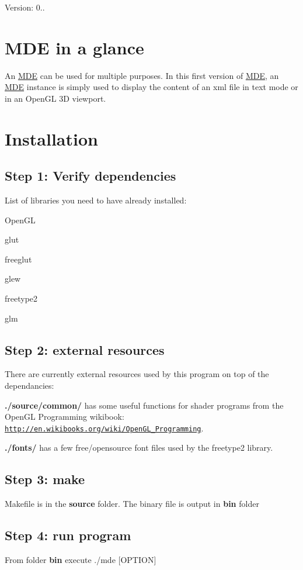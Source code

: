 Version\+: 0..\hypertarget{index_intro_sec}{}\section{M\+D\+E in a glance}\label{index_intro_sec}
An \hyperlink{classMDE}{M\+DE} can be used for multiple purposes. In this first version of \hyperlink{classMDE}{M\+DE}, an \hyperlink{classMDE}{M\+DE} instance is simply used to display the content of an xml file in text mode or in an Open\+GL 3D viewport.\hypertarget{index_install_sec}{}\section{Installation}\label{index_install_sec}
\hypertarget{index_step1}{}\subsection{Step 1\+: Verify dependencies}\label{index_step1}
List of libraries you need to have already installed\+: 
\begin{DoxyItemize}
\item Open\+GL 
\item glut 
\item freeglut 
\item glew 
\item freetype2 
\item glm 
\end{DoxyItemize}\hypertarget{index_step2}{}\subsection{Step 2\+: external resources}\label{index_step2}
There are currently external resources used by this program on top of the dependancies\+: 
\begin{DoxyItemize}
\item {\bfseries ./source/common/} has some useful functions for shader programs from the Open\+GL Programming wikibook\+: \href{http://en.wikibooks.org/wiki/OpenGL_Programming}{\tt http\+://en.\+wikibooks.\+org/wiki/\+Open\+G\+L\+\_\+\+Programming}. 
\item {\bfseries ./fonts/} has a few free/opensource font files used by the freetype2 library. 
\end{DoxyItemize}\hypertarget{index_step3}{}\subsection{Step 3\+: make}\label{index_step3}
Makefile is in the {\bfseries source} folder. The binary file is output in {\bfseries bin} folder\hypertarget{index_step4}{}\subsection{Step 4\+: run program}\label{index_step4}
From folder {\bfseries bin} execute ./mde \mbox{[}O\+P\+T\+I\+ON\mbox{]}

